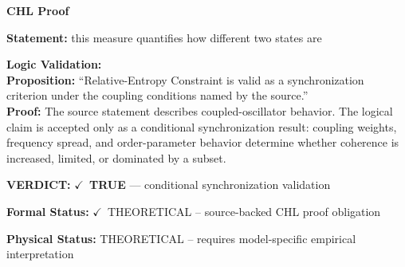 \vspace{0.45em}
\noindent\textbf{CHL Proof}\par
\textbf{Statement:} this measure quantifies how different two states are

\textbf{Logic Validation:}\\
\textbf{Proposition:} ``Relative-Entropy Constraint is valid as a synchronization criterion under the coupling
conditions named by the source.''\\
\textbf{Proof:} The source statement describes coupled-oscillator behavior. The logical claim is
accepted only as a conditional synchronization result: coupling weights, frequency
spread, and order-parameter behavior determine whether coherence is increased, limited,
or dominated by a subset.

\textbf{VERDICT:} \ensuremath{\checkmark}\ \textbf{TRUE} --- conditional synchronization validation

\textbf{Formal Status:} \ensuremath{\checkmark}\ THEORETICAL -- source-backed CHL proof obligation

\textbf{Physical Status:} THEORETICAL -- requires model-specific empirical interpretation
\par\vspace{0.45em}
\par
\ifTZPDarkEdition
{}
\fi
\endgroup
\endgroup
